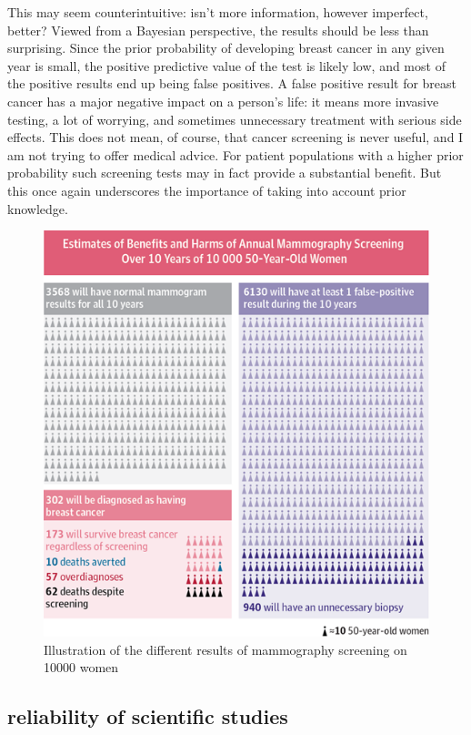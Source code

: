 \documentclass[
]{book}
\theoremstyle{definition}
\theoremstyle{definition}
\theoremstyle{definition}
\theoremstyle{remark}
\begin{document}
This may seem counterintuitive: isn't more information, however imperfect, better? Viewed from a Bayesian perspective, the results should be less than surprising. Since the prior probability of developing breast cancer in any given year is small, the positive predictive value of the test is likely low, and most of the positive results end up being false positives. A false positive result for breast cancer has a major negative impact on a person's life: it means more invasive testing, a lot of worrying, and sometimes unnecessary treatment with serious side effects. This does not mean, of course, that cancer screening is never useful, and I am not trying to offer medical advice. For patient populations with a higher prior probability such screening tests may in fact provide a substantial benefit. But this once again underscores the importance of taking into account prior knowledge.

\begin{figure}
\centering
\includegraphics{ch7/m_jpg140030fa.png}
\caption{Illustration of the different results of mammography screening on 10000 women}
\end{figure}

\hypertarget{reliability-of-scientific-studies}{%
\subsection{reliability of scientific studies}\label{reliability-of-scientific-studies}}
\end{document}
